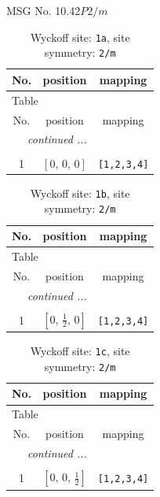 \documentclass[fleqn,8pt]{jsarticle}
\begin{document}
\setcounter{MaxMatrixCols}{32}

\renewcommand{\tablename}{Table~}
\renewcommand{\figurename}{Figure~}
\begin{center}
\LARGE
MSG No. 10.42\quad$P2/m$
\end{center}
\renewcommand{\arraystretch}{1.2}
\begin{longtable}{ccc}
\caption{Wyckoff site: {\tt 1a}, site symmetry: {\tt 2/m}}
 \\
 \hline \hline
No. & position & mapping \\ \hline \endfirsthead

\multicolumn{2}{l}{\tablename\ \thetable{}} \\
 \hline \hline
No. & position & mapping \\ \hline \endhead

 \hline \hline
\multicolumn{2}{r}{\footnotesize\it continued ...} \\ \endfoot

 \hline \hline
\multicolumn{2}{r}{} \\ \endlastfoot

1 & $\left[ 0,\, 0,\, 0 \right]$ & {\tt [1,2,3,4]} \\
\end{longtable}
\renewcommand{\arraystretch}{1.2}
\begin{longtable}{ccc}
\caption{Wyckoff site: {\tt 1b}, site symmetry: {\tt 2/m}}
 \\
 \hline \hline
No. & position & mapping \\ \hline \endfirsthead

\multicolumn{2}{l}{\tablename\ \thetable{}} \\
 \hline \hline
No. & position & mapping \\ \hline \endhead

 \hline \hline
\multicolumn{2}{r}{\footnotesize\it continued ...} \\ \endfoot

 \hline \hline
\multicolumn{2}{r}{} \\ \endlastfoot

1 & $\left[ 0,\, \frac{1}{2},\, 0 \right]$ & {\tt [1,2,3,4]} \\
\end{longtable}
\renewcommand{\arraystretch}{1.2}
\begin{longtable}{ccc}
\caption{Wyckoff site: {\tt 1c}, site symmetry: {\tt 2/m}}
 \\
 \hline \hline
No. & position & mapping \\ \hline \endfirsthead

\multicolumn{2}{l}{\tablename\ \thetable{}} \\
 \hline \hline
No. & position & mapping \\ \hline \endhead

 \hline \hline
\multicolumn{2}{r}{\footnotesize\it continued ...} \\ \endfoot

 \hline \hline
\multicolumn{2}{r}{} \\ \endlastfoot

1 & $\left[ 0,\, 0,\, \frac{1}{2} \right]$ & {\tt [1,2,3,4]} \\
\end{longtable}
\end{document}
